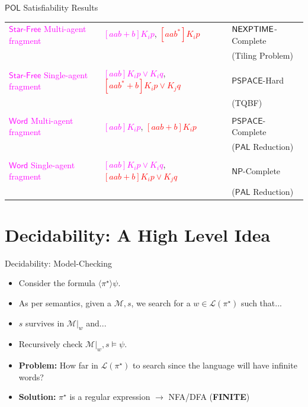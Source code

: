 \documentclass[usenames,dvipsnames]{beamer}
\newcommand\ldiaarg[1]{\langle#1\rangle}
\newcommand{\M}{\mathcal{M}}
\newcommand{\LL}{\mathcal{L}} %
\newcommand{\POL}{\mathsf{POL}}
\newcommand{\starfree}{\mathsf{Star\mbox{-}Free}}
\newcommand{\word}{\mathsf{Word}}
\newcommand{\PSPACE}{\mathsf{PSPACE}}
\newcommand{\NP}{\mathsf{NP}}
\begin{document}
\newcommand{\PAL}{\mathsf{PAL}}
\begin{frame}{$\POL$ Satisfiability Results}
    \begin{center}
        \begin{tabular}{ m{9em} m{4cm} m{3cm} } 
         \textcolor{Fuchsia}{\textbf{$\starfree$} Multi-agent fragment} & \textcolor{Fuchsia}{$[aab+b]K_i p$}, \textcolor{Red}{\st{$[aab^*]K_i p$}} & $\mathsf{NEXPTIME}$-Complete \\
         & & (Tiling Problem)\\
         & &\\
         \textcolor{Fuchsia}{\textbf{$\starfree$} Single-agent fragment} & \textcolor{Fuchsia}{$[aab]K_i p\vee K_i q$}, \textcolor{Red}{\st{$[aab^*+b]K_i p\vee K_j q$}} & $\PSPACE$-Hard \\ 
         & & (TQBF)\\
         & &\\
         \textcolor{Fuchsia}{$\word$ Multi-agent fragment} & \textcolor{Fuchsia}{$[aab]K_i p$}, \textcolor{Red}{\st{$[aab+b]K_i p$}} & $\PSPACE$-Complete\\
         & & ($\PAL$ Reduction)\\
         & &\\
         \textcolor{Fuchsia}{$\word$ Single-agent fragment} & \textcolor{Fuchsia}{$[aab]K_i p\vee K_i q$}, \textcolor{Red}{\st{$[aab+b]K_i p\vee K_j q$}} & $\NP$-Complete\\
         & & ($\PAL$ Reduction)
        \end{tabular}
    \end{center}
\end{frame}



\section{Decidability: A High Level Idea}
    \begin{frame}{Decidability: Model-Checking}
        \begin{itemize}
        \setlength\itemsep{1em}
            \item<1-> Consider the formula $\ldiaarg{\pi^\star}\psi$.
            \item<2-> As per semantics, given a $\M,s$, we search for a $w\in\LL(\pi^\star)$ such that...

            \item<3-> $s$ survives in $\M|_w$ and...

            \item<4-> Recursively check $\M|_w,s\vDash\psi$.

            \item<5-> \textbf{Problem:} How far in $\LL(\pi^\star)$ to search since the language will have infinite words?

            \item<6-> \textbf{Solution:} $\pi^\star$ is a regular expression $\longrightarrow$ NFA/DFA (\textbf{FINITE})
        \end{itemize}
    \end{frame}
\end{document}
